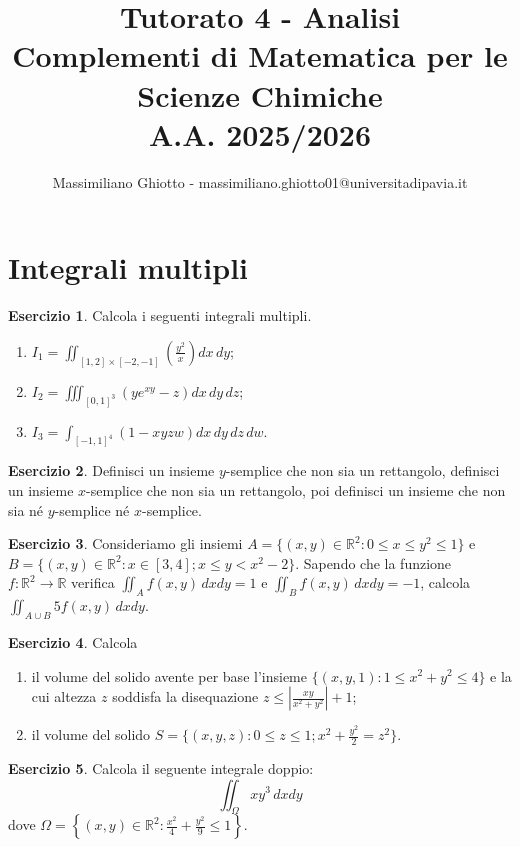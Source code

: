 \documentclass[12pt,a4paper]{article}
\title{Tutorato 4 - Analisi\\Complementi di Matematica per le Scienze Chimiche\\ A.A. 2025/2026}
\author{Massimiliano Ghiotto - massimiliano.ghiotto01@universitadipavia.it}
\date{}
\theoremstyle{definition}
\newtheorem{exe}{Esercizio}
\begin{document}
\maketitle

\section*{Integrali multipli}

\begin{exe}
    Calcola i seguenti integrali multipli.
    \begin{enumerate}
        \item $I_1 = \iint_{[1,2]\times[-2,-1]} \left(\frac{y^2}{x}\right) dx \, dy$;
        \item $I_2 = \iiint_{[0,1]^3} (y e^{xy} - z) dx \, dy \, dz$;
        \item $I_3 = \int_{[-1,1]^4} (1 - xyzw) dx \, dy \, dz \, dw$.
    \end{enumerate}
\end{exe}

\begin{exe}
    Definisci un insieme $y$-semplice che non sia un rettangolo, definisci un insieme $x$-semplice che non sia un rettangolo, poi definisci un insieme che non sia né $y$-semplice né $x$-semplice.
\end{exe}

\begin{exe}
    Consideriamo gli insiemi $A = \{(x,y) \in \mathbb{R}^2 : 0 \leq x \leq y^2 \leq 1\}$ e $B = \{(x,y) \in \mathbb{R}^2 : x \in [3,4]; x \leq y < x^2-2\}$. Sapendo che la funzione $f : \mathbb{R}^2 \to \mathbb{R}$ verifica $\iint_A f(x,y) \, dx dy = 1$ e $\iint_B f(x,y) \, dx dy = -1$, calcola $\iint_{A \cup B} 5f(x,y) \, dx dy$.
\end{exe}

\begin{exe}
    Calcola
    \begin{enumerate}
        \item il volume del solido avente per base l'insieme $\{(x,y,1) : 1 \leq x^2 + y^2 \leq 4\}$ e la cui altezza $z$ soddisfa la disequazione $z \leq \left| \frac{xy}{x^2+y^2} \right| + 1$;
        \item il volume del solido $S = \{(x,y,z) : 0 \leq z \leq 1; x^2 + \frac{y^2}{2} = z^2 \}$.
    \end{enumerate}
\end{exe}

\begin{exe}
    Calcola il seguente integrale doppio:
    \[ \iint_\Omega xy^3 \, dx dy \]
    dove $\Omega = \left\{(x,y) \in \mathbb{R}^2 : \frac{x^2}{4} + \frac{y^2}{9} \leq 1\right\}$.
\end{exe}
\end{document}

